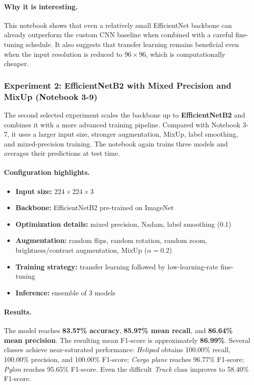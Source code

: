 \paragraph{Why it is interesting.} This notebook shows that even a relatively small EfficientNet backbone can already outperform the custom CNN baseline when combined with a careful fine-tuning schedule. It also suggests that transfer learning remains beneficial even when the input resolution is reduced to $96 \times 96$, which is computationally cheaper.

\subsubsection{Experiment 2: EfficientNetB2 with Mixed Precision and MixUp (Notebook 3-9)}

The second selected experiment scales the backbone up to \textbf{EfficientNetB2} and combines it with a more advanced training pipeline. Compared with Notebook 3-7, it uses a larger input size, stronger augmentation, MixUp, label smoothing, and mixed-precision training. The notebook again trains three models and averages their predictions at test time.

\paragraph{Configuration highlights.}
\begin{itemize}
    \item \textbf{Input size:} $224 \times 224 \times 3$
    \item \textbf{Backbone:} EfficientNetB2 pre-trained on ImageNet
    \item \textbf{Optimization details:} mixed precision, Nadam, label smoothing (0.1)
    \item \textbf{Augmentation:} random flips, random rotation, random zoom, brightness/contrast augmentation, MixUp ($\alpha=0.2$)
    \item \textbf{Training strategy:} transfer learning followed by low-learning-rate fine-tuning
    \item \textbf{Inference:} ensemble of 3 models
\end{itemize}

\paragraph{Results.} The model reaches \textbf{83.57\% accuracy}, \textbf{85.97\% mean recall}, and \textbf{86.64\% mean precision}. The resulting mean F1-score is approximately \textbf{86.99\%}. Several classes achieve near-saturated performance: \textit{Helipad} obtains 100.00\% recall, 100.00\% precision, and 100.00\% F1-score; \textit{Cargo plane} reaches 96.77\% F1-score; \textit{Pylon} reaches 95.65\% F1-score. Even the difficult \textit{Truck} class improves to 58.40\% F1-score.


